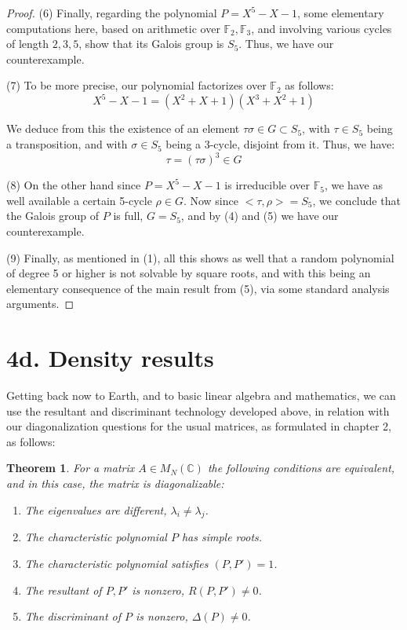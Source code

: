 \documentclass[12pt]{amsbook}
\newtheorem{theorem}{Theorem}[chapter]
\begin{document}
\begin{proof}
\medskip

(6) Finally, regarding the polynomial $P=X^5-X-1$, some elementary computations here, based on arithmetic over $\mathbb F_2,\mathbb F_3$, and involving various cycles of length $2,3,5$, show that its Galois group is $S_5$. Thus, we have our counterexample.

\medskip

(7) To be more precise, our polynomial factorizes over $\mathbb F_2$ as follows:
$$X^5-X-1=(X^2+X+1)(X^3+X^2+1)$$

We deduce from this the existence of an element $\tau\sigma\in G\subset S_5$, with $\tau\in S_5$ being a transposition, and with $\sigma\in S_5$ being a 3-cycle, disjoint from it. Thus, we have:
$$\tau=(\tau\sigma)^3\in G$$

(8) On the other hand since $P=X^5-X-1$ is irreducible over $\mathbb F_5$, we have as well available a certain 5-cycle $\rho\in G$. Now since $<\tau,\rho>=S_5$, we conclude that the Galois group of $P$ is full, $G=S_5$, and by (4) and (5) we have our counterexample.

\medskip

(9) Finally, as mentioned in (1), all this shows as well that a random polynomial of degree 5 or higher is not solvable by square roots, and with this being an elementary consequence of the main result from (5), via some standard analysis arguments.
\end{proof}

\section*{4d. Density results}

Getting back now to Earth, and to basic linear algebra and mathematics, we can use the resultant and discriminant technology developed above, in relation with our diagonalization questions for the usual matrices, as formulated in chapter 2, as follows:

\begin{theorem}
For a matrix $A\in M_N(\mathbb C)$ the following conditions are equivalent, and in this case, the matrix is diagonalizable:
\begin{enumerate}
\item The eigenvalues are different, $\lambda_i\neq\lambda_j$.

\item The characteristic polynomial $P$ has simple roots.

\item The characteristic polynomial satisfies $(P,P')=1$.

\item The resultant of $P,P'$ is nonzero, $R(P,P')\neq0$.

\item The discriminant of $P$ is nonzero, $\Delta(P)\neq0$.
\end{enumerate}
\end{theorem}
\end{document}
